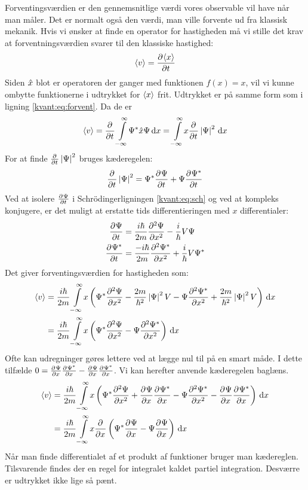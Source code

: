 \documentclass[../Kvantemekanik.tex]{subfiles}
\begin{document}
Forventingsværdien er den gennemsnitlige værdi vores observable vil have når man måler. Det er normalt også den værdi, man ville forvente ud fra klassisk mekanik. Hvis vi ønsker at finde en operator for hastigheden må vi stille det krav at forventningsværdien svarer til den klassiske hastighed:
$$
\expect v = \pdif{t}{\expect x}
$$
Siden $\op x$ blot er operatoren der ganger med funktionen $f(x)=x$, vil vi kunne ombytte funktionerne i udtrykket for $\expect x$ frit. Udtrykket er på samme form som i ligning \eqref{kvant:eq:forvent}. Da de er 
$$
\expect v = 
\pdif{t}{} \integral{\Psi^*\op x\Psi}{x}{-\infty}{\infty} = 
\integral{x\pdif{t}{}\abs{\Psi}^2}{x}{-\infty}{\infty}
$$
For at finde $\pdif{t}{}\abs{\Psi}^2$ bruges kæderegelen:
$$
\pdif{t}{}\abs{\Psi}^2 = \Psi^*\pdif{t}{\Psi}+\Psi\pdif{t}{\Psi^*}
$$
Ved at isolere $\pdif{t}{\Psi}$ i Schrödingerligningen \eqref{kvant:eq:sch} og ved at kompleks konjugere, er det muligt at erstatte tids differentieringen med $x$ differentialer:
\begin{align*}
\pdif{t}{\Psi} &= \frac{i\hbar}{2m}\pdif[2]{x}{\Psi}-\frac{i}{\hbar}V\Psi\\
\pdif{t}{\Psi^*} &= \frac{-i\hbar}{2m}\pdif[2]{x}{\Psi^*}+\frac{i}{\hbar}V\Psi^*
\end{align*}
Det giver forventingsværdien for hastigheden som:
\begin{align*}
\expect v &= \frac{i\hbar}{2m}\integral{x
\left( 
\Psi^*\pdif[2]{x}{\Psi}-\frac{2m}{\hbar^2}\abs{\Psi}^2V
-\Psi\pdif[2]{x}{\Psi^*}+\frac{2m}{\hbar^2}\abs{\Psi}^2V
\right)}{x}{-\infty}{\infty} \\
&=
\frac{i\hbar}{2m}\integral{x\left(\Psi^*\pdif[2]{x}{\Psi}-\Psi\pdif[2]{x}{\Psi^*}\right)}{x}{-\infty}{\infty}
\end{align*}
Ofte kan udregninger gøres lettere ved at lægge nul til på en smart måde. I dette tilfælde $0=\pdif{x}{\Psi}\pdif{x}{\Psi^*}-\pdif{x}{\Psi}\pdif{x}{\Psi^*}$. Vi kan herefter anvende kæderegelen baglæns.
\begin{align*}
\expect v &= \frac{i\hbar}{2m}\integral{x\left(\Psi^*\pdif[2]{x}{\Psi}+\pdif{x}{\Psi}\pdif{x}{\Psi^*}-\Psi\pdif[2]{x}{\Psi^*}-\pdif{x}{\Psi}\pdif{x}{\Psi^*}\right)}{x}{-\infty}{\infty}\\
&= 
\frac{i\hbar}{2m}\integral{x\pdif{x}{}\left(\Psi^*\pdif{x}\Psi-\Psi\pdif{x}\Psi\right)}{x}{-\infty}{\infty}
\end{align*}
Når man finde differentialet af et produkt af funktioner bruger man kædereglen. Tilsvarende findes der en regel for integralet kaldet partiel integration. Desværre er udtrykket ikke lige så pænt.
\end{document}
